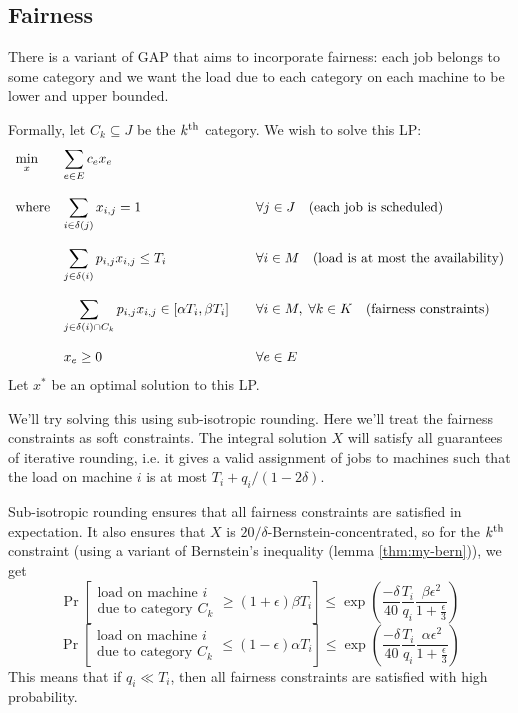 \subsection{Fairness}

There is a variant of GAP that aims to incorporate fairness:
each job belongs to some category and we want the load due to each category
on each machine to be lower and upper bounded.

Formally, let $C_k \subseteq J$ be the $k^{\textrm{th}}$ category.
We wish to solve this LP:
\[ \begin{array}{*3{>{\displaystyle}l}}
\min_x & \sum_{e \in E}{c_e}{x_e} &
\\ \\ \textrm{where} & \sum_{i \in \delta(j)} x_{i,j} = 1 & \quad \forall j \in J
\quad \textrm{(each job is scheduled)}
\\ \\ & \sum_{j \in \delta(i)} p_{i,j} x_{i,j} \le T_i & \quad \forall i \in M
\quad \textrm{(load is at most the availability)}
\\ \\ & \sum_{j \in \delta(i) \cap C_k} p_{i,j} x_{i,j} \in [\alpha T_i, \beta T_i]
& \quad \forall i \in M, \; \forall k \in K \quad \textrm{(fairness constraints)}
\\ \\ & x_e \ge 0 & \quad \forall e \in E
\end{array} \]
Let $x^*$ be an optimal solution to this LP.

We'll try solving this using sub-isotropic rounding.
Here we'll treat the fairness constraints as soft constraints.
The integral solution $X$ will satisfy all guarantees of iterative rounding,
i.e. it gives a valid assignment of jobs to machines such that the
load on machine $i$ is at most $T_i + q_i/(1-2\delta)$.

Sub-isotropic rounding ensures that all fairness constraints are satisfied in expectation.
It also ensures that $X$ is $20/\delta$-Bernstein-concentrated,
so for the $k^{\textrm{th}}$ constraint (using a variant of Bernstein's inequality
(lemma \ref{thm:my-bern})), we get
\[ \Pr\left[ \begin{array}{cc}\textrm{load on machine } i
\\ \textrm{due to category } C_k \end{array} \ge (1+\epsilon)\beta T_i \right]
\le \exp\left( \frac{-\delta}{40} \frac{T_i}{q_i}
\frac{\beta\epsilon^2}{1+\frac{\epsilon}{3}} \right) \]
\[ \Pr\left[ \begin{array}{cc}\textrm{load on machine } i
\\ \textrm{due to category } C_k \end{array} \le (1-\epsilon)\alpha T_i \right]
\le \exp\left( \frac{-\delta}{40} \frac{T_i}{q_i}
\frac{\alpha\epsilon^2}{1+\frac{\epsilon}{3}} \right) \]
This means that if $q_i \ll T_i$, then all fairness constraints
are satisfied with high probability.
